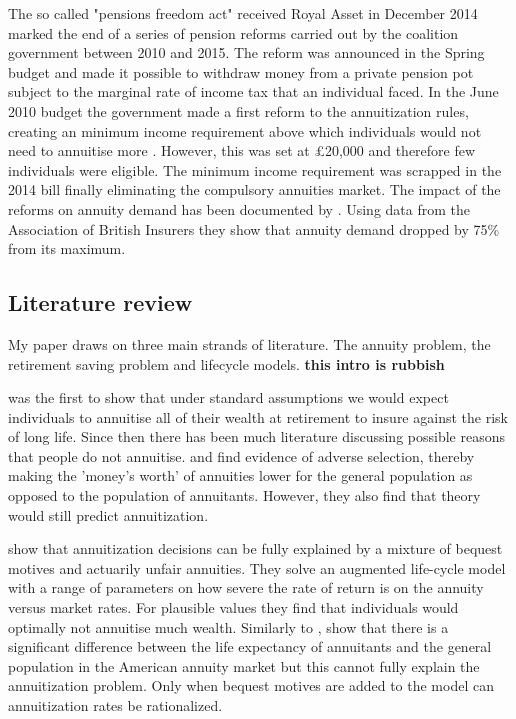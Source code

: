 \documentclass[12pt]{article}
\begin{document}
The so called "pensions freedom act" received Royal Asset in December 2014 marked the end of a series
of pension reforms carried out by the coalition government between 2010 and 2015. The reform was announced
in the Spring budget and made it possible to withdraw money from a private pension pot subject to the
marginal rate of income tax that an individual faced. In the June 2010 budget the government made a first
reform to the annuitization rules, creating an minimum income requirement above which individuals would not need to
annuitise more \cite{finance_act_hmt_2011}. However, this was set at £20,000 and therefore few individuals
were eligible. The minimum income requirement was scrapped in the 2014 bill finally eliminating the
compulsory annuities market. The impact of the reforms on annuity demand has been documented by \cite{cannon_et_al_nier_2016}.
Using data from the Association of British Insurers they show that annuity demand dropped by 75\% from
its maximum.

\subsection{Literature review}
My paper draws on three main strands of literature. The annuity problem, the retirement saving
problem and lifecycle models. \textbf{this intro is rubbish}

\cite{yaari_65} was the first to show that under standard assumptions we would expect individuals to
annuitise all of their wealth at retirement to insure against the risk of long life. Since then there
has been much literature discussing possible reasons that people do not annuitise. \cite{finkelstein_porteba_2002}
and \cite{finkelstein_porteba_2004} find evidence of adverse selection, thereby making the 'money's worth'
of annuities lower for the general population as opposed to the population of annuitants. However, they
also find that theory would still predict annuitization.

\cite{friedman_warshawsky_qje_1990} show that annuitization decisions can be fully explained by a mixture of
bequest motives and actuarily unfair annuities. They solve an augmented life-cycle model with a range of
parameters on how severe the rate of return is on the annuity versus market rates. For plausible values
they find that individuals would optimally not annuitise much wealth. Similarly to \cite{finkelstein_porteba_2004},
\cite{friedman_warshawsky_chicago_1988} show that there is a significant difference between the life expectancy of
annuitants and the general population in the American annuity market but this cannot fully explain the annuitization
problem. Only when bequest motives are added to the model can annuitization rates be rationalized.
\end{document}
